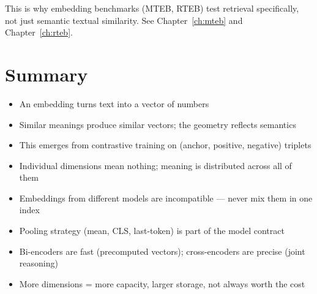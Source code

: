 This is why embedding benchmarks (MTEB, RTEB) test retrieval specifically, not just
semantic textual similarity. See Chapter~\ref{ch:mteb} and Chapter~\ref{ch:rteb}.

\section{Summary}

\begin{itemize}
    \item An embedding turns text into a vector of numbers
    \item Similar meanings produce similar vectors; the geometry reflects semantics
    \item This emerges from contrastive training on (anchor, positive, negative) triplets
    \item Individual dimensions mean nothing; meaning is distributed across all of them
    \item Embeddings from different models are incompatible --- never mix them in one index
    \item Pooling strategy (mean, CLS, last-token) is part of the model contract
    \item Bi-encoders are fast (precomputed vectors); cross-encoders are precise (joint reasoning)
    \item More dimensions = more capacity, larger storage, not always worth the cost
\end{itemize}
